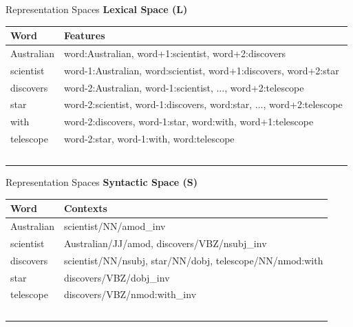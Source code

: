 \documentclass[10pt,xcolor=table]{beamer}
\begin{document}
%


\begin{frame}{Representation Spaces}
\large \textbf{Lexical Space (L)}
\vspace{1cm}
\small

\begin{tabular}{ll}
	
	\hline 
	 \textbf{Word} & \textbf{Features} \\ 
	\hline 
	Australian & word:Australian, word+1:scientist, word+2:discovers\\ 
	scientist  &  word-1:Australian, word:scientist, word+1:discovers, word+2:star\\ 
	discovers & word-2:Australian, word-1:scientist, $\dots$, word+2:telescope \\ 
	star & word-2:scientist, word-1:discovers, word:star, $\dots$, word+2:telescope \\ 
	with & word-2:discovers, word-1:star, word:with, word+1:telescope \\ 
	telescope  &  word-2:star, word-1:with, word:telescope \\ 
	\hline \
\end{tabular} 
\vspace{\textheight}
\end{frame}


\begin{frame}{Representation Spaces}
	\large \textbf{Syntactic Space (S)}
	\vspace{1cm}
	\small
	
	
	\begin{tabular}{ll}
	\hline 
	 Word & Contexts \\ 
	\hline 
	Australian & scientist/NN/amod\_inv \\ 
	scientist  &  Australian/JJ/amod, discovers/VBZ/nsubj\_inv\\ 
	discovers & scientist/NN/nsubj, star/NN/dobj, telescope/NN/nmod:with \\ 
	star & discovers/VBZ/dobj\_inv \\ 
	telescope  &  discovers/VBZ/nmod:with\_inv \\ 
	\hline \
	\end{tabular} 
	 
	\vspace{\textheight}
\end{frame}
\end{document}
